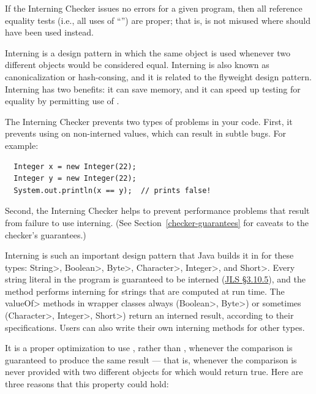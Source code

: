 
If the Interning Checker issues no errors for a given program, then all
reference equality tests (i.e., all uses of ``\code{==}'') are proper;
that is,
\code{==} is not misused where  should have been used instead.

Interning is a design pattern in which the same object is used whenever two
different objects would be considered equal.  Interning is also known as
canonicalization or hash-consing, and it is related to the flyweight design
pattern.
Interning has two benefits:  it can save memory, and it can speed up testing for
equality by permitting use of \code{==}.

The Interning Checker prevents two types of problems in your code.
First, it prevents using \code{==} on
non-interned values, which can result in subtle bugs.  For example:

\begin{Verbatim}
  Integer x = new Integer(22);
  Integer y = new Integer(22);
  System.out.println(x == y);  // prints false!
\end{Verbatim}

\noindent
Second,
the Interning Checker helps to prevent performance problems that result
from failure to use interning.
(See Section~\ref{checker-guarantees} for caveats to the checker's guarantees.)

Interning is such an important design pattern that Java builds it in for
these types: \<String>, \<Boolean>, \<Byte>, \<Character>, \<Integer>,
and \<Short>.  Every string literal in the program is guaranteed to be interned
(\href{https://docs.oracle.com/javase/specs/jls/se25/html/jls-3.html#jls-3.10.5}{JLS
  \S3.10.5}), and the
 method
performs interning for strings that are computed at run time.
The \<valueOf> methods in wrapper classes always (\<Boolean>, \<Byte>) or
sometimes (\<Character>, \<Integer>, \<Short>) return an interned result,
according to their specifications.
Users can also write their own interning methods for other types.

It is a proper optimization to use \code{==}, rather than ,
whenever the comparison is guaranteed to produce the same result --- that
is, whenever the comparison is never provided with two different objects
for which  would return true.  Here are three reasons that
this property could hold:

